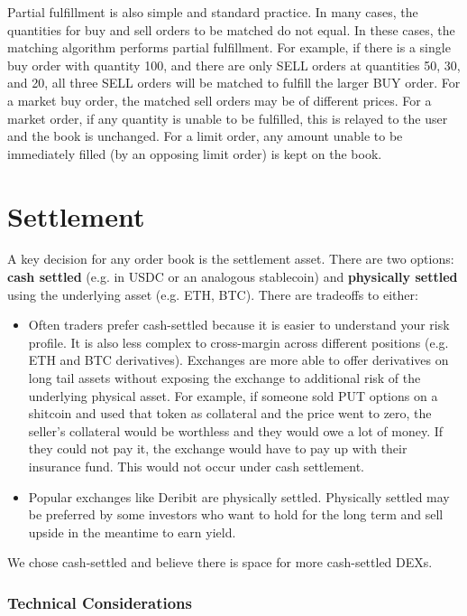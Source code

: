 \documentclass{article}
\begin{document}
\noindent Partial fulfillment is also simple and standard practice. In many cases, the quantities for buy and sell orders to be matched do not equal. In these cases, the matching algorithm performs partial fulfillment. For example, if there is a single buy order with quantity 100, and there are only SELL orders at quantities 50, 30, and 20, all three SELL orders will be matched to fulfill the larger BUY order. For a market buy order, the matched sell orders may be of different prices. For a market order, if any quantity is unable to be fulfilled, this is relayed to the user and the book is unchanged. For a limit order, any amount unable to be immediately filled (by an opposing limit order) is kept on the book. \\

\section{Settlement}

\noindent A key decision for any order book is the settlement asset. There are two options: \textbf{cash settled} (e.g. in USDC or an analogous stablecoin) and \textbf{physically settled} using the underlying asset (e.g. ETH, BTC). There are tradeoffs to either:
\begin{itemize}
    \item Often traders prefer cash-settled because it is easier to understand your risk profile. It is also less complex to cross-margin across different positions (e.g. ETH and BTC derivatives). Exchanges are more able to offer derivatives on long tail assets without exposing the exchange to additional risk of the underlying physical asset. For example, if someone sold PUT options on a shitcoin and used that token as collateral and the price went to zero, the seller's collateral would be worthless and they would owe a lot of money. If they could not pay it, the exchange would have to pay up with their insurance fund. This would not occur under cash settlement.
    \item Popular exchanges like Deribit are physically settled. Physically settled may be preferred by some investors who want to hold for the long term and sell upside in the meantime to earn yield.   
\end{itemize}

\noindent We chose cash-settled and believe there is space for more cash-settled DEXs.

\subsubsection{Technical Considerations} 
\label{sec:tech:settlement}
\end{document}
